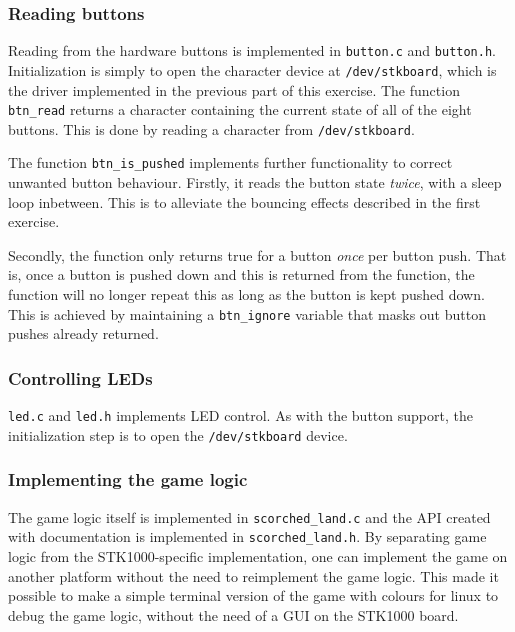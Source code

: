 \subsubsection{Reading buttons}

Reading from the hardware buttons is implemented in \texttt{button.c}
and \texttt{button.h}. Initialization is simply to open the character
device at \texttt{/dev/stkboard}, which is the driver implemented in the
previous part of this exercise. The function \texttt{btn\_read} returns
a character containing the current state of all of the eight buttons.
This is done by reading a character from \texttt{/dev/stkboard}.

The function \texttt{btn\_is\_pushed} implements further functionality to
correct unwanted button behaviour. Firstly, it reads the button state
\emph{twice}, with a sleep loop inbetween. This is to alleviate the
bouncing effects described in the first exercise.

Secondly, the function only returns true for a button \emph{once} per
button push. That is, once a button is pushed down and this is returned
from the function, the function will no longer repeat this as long as
the button is kept pushed down. This is achieved by maintaining a
\texttt{btn\_ignore} variable that masks out button pushes already
returned.

\subsubsection{Controlling LEDs}

\texttt{led.c} and \texttt{led.h} implements LED control. As with the
button support, the initialization step is to open the
\texttt{/dev/stkboard} device.

\subsubsection{Implementing the game logic}
\label{subsec:game-logic}
The game logic itself is implemented in \texttt{scorched\_land.c} and the
API created with documentation is implemented in
\texttt{scorched\_land.h}. By separating game logic from the
STK1000-specific implementation, one can implement the game on another
platform without the need to reimplement the game logic. This made it
possible to make a simple terminal version of the game with colours for
linux to debug the game logic, without the need of a GUI on the STK1000
board. 

